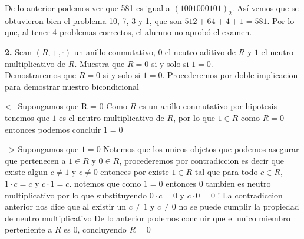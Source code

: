 \documentclass[12pt]{article}
\begin{document}
De lo anterior podemos ver que 581 es igual a $(1001000101)_2$. Así vemos que se obtuvieron bien el problema 10, 7, 3 y 1, que son 
$512 + 64 + 4 + 1 = 581$. Por lo que, al tener 4 problemas correctos, el alumno no aprobó el examen.

%
%
\textbf{2.} Sean $(R, +, ·)$ un anillo conmutativo, $0$ el neutro aditivo de $R$ y $1$ el neutro multiplicativo de $R$. Muestra
que $R = {0}$ si y solo si $1 = 0$. \\

Demostraremos que $R = {0}$ si y solo si $1 = 0$.
Procederemos por doble implicacion para demostrar nuestro bicondicional

<--
Supongamos que R = {0}
Como $R$ es un anillo conmutativo por hipotesis tenemos que $1$ es el neutro multiplicativo de $R$, por lo que $1 \in R$ como $R = {0}$ entonces podemos concluir
$1 = 0$

-->
Supongamos que $1 = 0$
Notemos que los unicos objetos que podemos asegurar que pertenecen a $1 \in R$ y $0 \in R$, procederemos por contradiccion es decir que existe algun $c \neq 1$ y $c \neq 0$ entonces
por existe $1 \in R$ tal que para todo $c \in R$, $1 · c = c$ y $c · 1 = c$.
notemos que como $1 = 0$ entonces $0$ tambien es neutro multiplicativo por lo que substituyendo
$0 · c = 0$ y $c · 0 = 0$ !
La contradiccion anterior nos dice que al existir un $c \neq 1$ y $c \neq 0$ no se puede cumplir la propiedad de neutro multiplicativo
De lo anterior podemos concluir que el unico miembro perteniente a $R$ es $0$, concluyendo $R = {0}$
\end{document}

